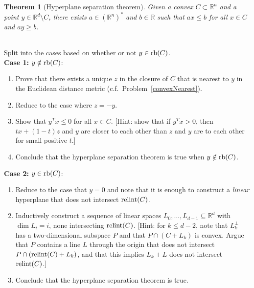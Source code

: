 \documentclass[letterpaper,11pt]{amsart}
\theoremstyle{plain}
\newtheorem*{thm*}{Theorem}
\theoremstyle{definition}
\theoremstyle{remark}
\newcommand{\rb}{{\rm rb}}
\newcommand{\ri}{{\rm relint}}
\begin{document}
\begin{thm*}[Hyperplane separation theorem]
    Given a convex $C\subset \mathbb{R}^n$ and a point $y \in \mathbb{R}^d\setminus C$,
    there exists $a \in (\mathbb{R}^n)^*$ and $b \in \mathbb{R}$ such that $ax \le b$ for all $x \in C$ and $ay \ge b$.
\end{thm*}
\\
    Split into the cases based on whether or not $y \in \rb(C)$.\\
    {\bf Case 1:} $y \notin \rb(C)$:
    \begin{enumerate}
        \item Prove that there exists a unique $z$ in the closure of $C$ that is nearest
        to $y$ in the Euclidean distance metric (c.f.~Problem~\ref{convexNearest}).
        \item Reduce to the case where $z = -y$.
        \item Show that $y^Tx \le 0$ for all $x \in C$. [Hint: show that if $y^Tx > 0$,
        then $tx + (1-t)z$ and $y$ are closer to each other than $z$ and $y$ are to each other for small positive $t$.]
        \item Conclude that the hyperplane separation theorem is true when $y \notin \rb(C)$.
    \end{enumerate}
    {\bf Case 2:} $y \in \rb(C)$:
    \begin{enumerate}
        \item Reduce to the case that $y = 0$ and note that it is enough to construct a \emph{linear} hyperplane
        that does not intersect $\ri(C)$.
        \item Inductively construct a sequence of linear spaces $L_0,\dots,L_{d-1} \subseteq \mathbb{R}^d$ with $\dim L_i = i$,
        none intersecting $\ri(C)$. [Hint: for $k \le d-2$, note that $L_k^\perp$ has a two-dimensional subspace $P$
        and that $P \cap (C + L_k)$ is convex.
        Argue that $P$ contains a line $L$ through the origin that does not intersect $P \cap (\ri(C) + L_k)$, and that this implies $L_k + L$ does not intersect $\ri(C)$.]
        \item Conclude that the hyperplane separation theorem is true.
    \end{enumerate}
\end{document}
